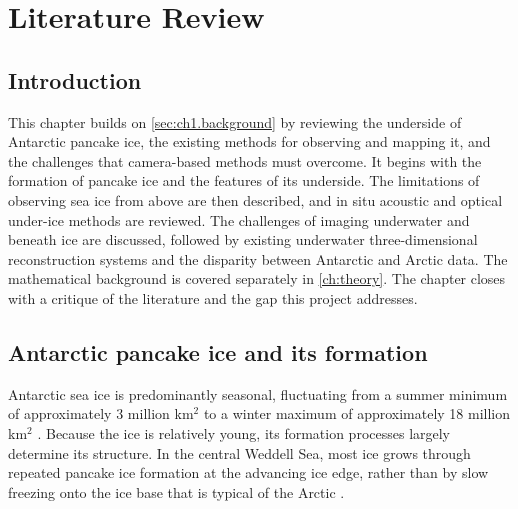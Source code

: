 \chapter{Literature Review}
\label{ch:review}

\section{Introduction}
\label{sec:ch2.introduction}
This chapter builds on \autoref{sec:ch1.background} by reviewing the underside of Antarctic pancake ice, the existing
methods for observing and mapping it, and the challenges that camera-based methods must overcome.
It begins with the formation of pancake ice and the features of its underside. The limitations of observing sea ice
from above are then described, and in situ acoustic and optical under-ice methods are reviewed.
The challenges of imaging underwater and beneath ice are discussed, followed by existing underwater
three-dimensional reconstruction systems and the disparity between Antarctic and Arctic data.
The mathematical background is covered separately in \autoref{ch:theory}.
The chapter closes with a critique of the literature and the gap this project addresses.


\section{Antarctic pancake ice and its formation}
\label{sec:ch2.pancake_ice}
 Antarctic sea ice is predominantly seasonal, fluctuating from a summer minimum of approximately 
3 million km$^2$ to a winter maximum of approximately 18 million km$^2$ \cite{parkinson40yRecordReveals2019}. 
Because the ice is relatively young, its formation processes largely determine its structure. In the central Weddell Sea,
 most ice grows through repeated pancake ice formation at the advancing ice edge, 
rather than by slow freezing onto the ice base that is typical of the Arctic \cite{langeDevelopmentSeaIce1989}.


